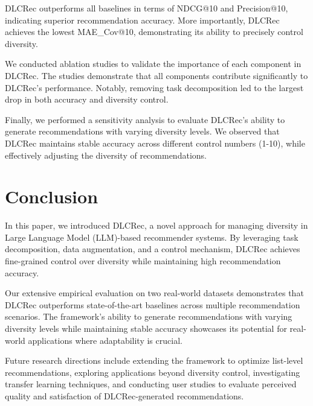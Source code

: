 \documentclass[12pt,letterpaper]{article}
\begin{document}
DLCRec outperforms all baselines in terms of NDCG@10 and Precision@10, indicating superior recommendation accuracy. More importantly, DLCRec achieves the lowest MAE_Cov@10, demonstrating its ability to precisely control diversity.

We conducted ablation studies to validate the importance of each component in DLCRec. The studies demonstrate that all components contribute significantly to DLCRec's performance. Notably, removing task decomposition led to the largest drop in both accuracy and diversity control.

Finally, we performed a sensitivity analysis to evaluate DLCRec's ability to generate recommendations with varying diversity levels. We observed that DLCRec maintains stable accuracy across different control numbers (1-10), while effectively adjusting the diversity of recommendations.

\section{Conclusion}

In this paper, we introduced DLCRec, a novel approach for managing diversity in Large Language Model (LLM)-based recommender systems. By leveraging task decomposition, data augmentation, and a control mechanism, DLCRec achieves fine-grained control over diversity while maintaining high recommendation accuracy.

Our extensive empirical evaluation on two real-world datasets demonstrates that DLCRec outperforms state-of-the-art baselines across multiple recommendation scenarios. The framework's ability to generate recommendations with varying diversity levels while maintaining stable accuracy showcases its potential for real-world applications where adaptability is crucial.

Future research directions include extending the framework to optimize list-level recommendations, exploring applications beyond diversity control, investigating transfer learning techniques, and conducting user studies to evaluate perceived quality and satisfaction of DLCRec-generated recommendations.
\end{document}
